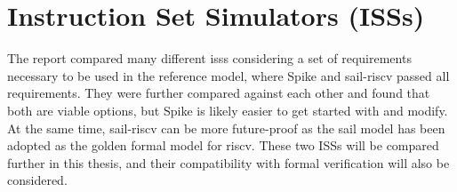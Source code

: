 \section{Instruction Set Simulators (ISSs)}
\label{sec:pw_iss}

The report compared many different \acrshort{iss}s considering a set of requirements necessary to be used in the reference model, where Spike \cite{SpikeRISCVISA2023} and sail-riscv \cite{RISCVSailModel2023} passed all requirements. They were further compared against each other and found that both are viable options, but Spike is likely easier to get started with and modify. At the same time, sail-riscv can be more future-proof as the sail model has been adopted as the golden formal model for \acrshort{riscv}. These two ISSs will be compared further in this thesis, and their compatibility with formal verification will also be considered.




